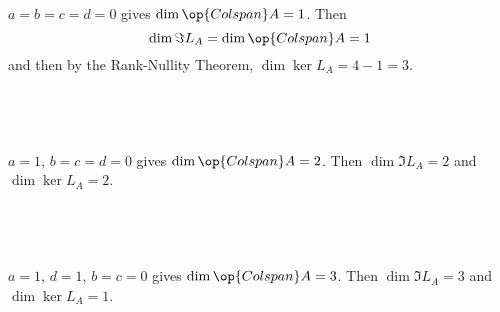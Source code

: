 \documentclass[a4paper]{article}
\begin{document}
$a = b = c = d = 0$ gives $\dim \op{Colspan} A = 1$. Then $$\dim \Im L_A = \dim \op{Colspan} A = 1$$
and then by the Rank-Nullity Theorem, $\dim \ker L_A = 4 - 1 = 3$.

\subsection{~}

$a = 1$, $b = c = d = 0$ gives $\dim \op{Colspan} A = 2$. Then $\dim \Im L_A = 2$ and $\dim \ker L_A = 2$.

\subsection{~}

$a = 1$, $d = 1$, $b = c = 0$ gives $\dim \op{Colspan} A = 3$. Then $\dim \Im L_A = 3$ and $\dim \ker L_A = 1$.

\end{document}
